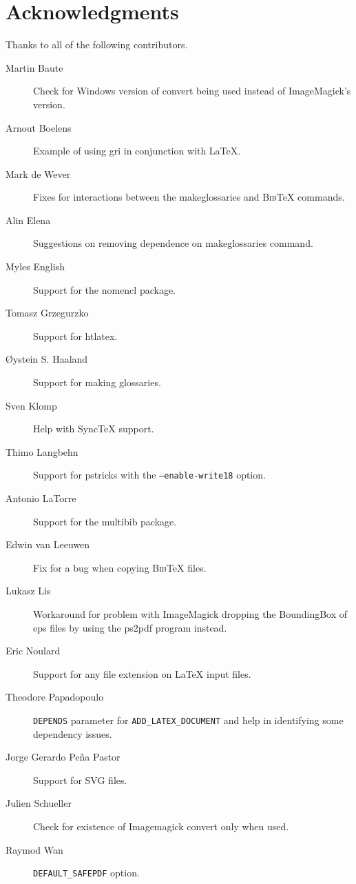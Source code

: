 \documentclass{article}
\newcommand*{\textfile}[1]{\textsf{#1}}
\newcommand*{\textprog}[1]{\textfile{#1}}
\newcommand*{\textlatexpackage}[1]{\textsf{#1}}
\newcommand*{\textcmake}[1]{\texttt{#1}}
\newcommand*{\latex}{\LaTeX\xspace}
\newcommand*{\bibtex}{\textsc{Bib}\TeX\xspace}
\renewcommand*{\synctex}{SyncTeX\xspace}
\newcommand*{\synctex}{SyncTeX\xspace}
\newcommand*{\ald}{\textcmake{ADD\_LATEX\_DOCUMENT}\xspace}
\begin{document}

  
  \section{Acknowledgments}

  Thanks to all of the following contributors.

  \begin{description}
  \item[Martin Baute] Check for Windows version of convert being used
    instead of ImageMagick's version.
  \item[Arnout Boelens] Example of using gri in conjunction with \latex.
  \item[Mark de Wever] Fixes for interactions between the
    \textprog{makeglossaries} and \bibtex commands.
  \item[Alin Elena] Suggestions on removing dependence on makeglossaries
    command.
  \item[Myles English] Support for the \textlatexpackage{nomencl} package.
  \item[Tomasz Grzegurzko] Support for htlatex.
  \item[\O{}ystein S. Haaland] Support for making glossaries.
  \item[Sven Klomp] Help with \synctex support.
  \item[Thimo Langbehn] Support for pstricks with the
    \textcmake{--enable-write18} option.
  \item[Antonio LaTorre] Support for the \textlatexpackage{multibib}
    package.
  \item[Edwin van Leeuwen] Fix for a bug when copying \bibtex files.
  \item[Lukasz Lis] Workaround for problem with ImageMagick dropping the
    BoundingBox of eps files by using the \textprog{ps2pdf} program
    instead.
  \item[Eric Noulard] Support for any file extension on \latex input files.
  \item[Theodore Papadopoulo] \textcmake{DEPENDS} parameter for \ald and
    help in identifying some dependency issues.
  \item[Jorge Gerardo Pe\~{n}a Pastor] Support for SVG files.
  \item[Julien Schueller] Check for existence of Imagemagick convert only
    when used.
  \item[Raymod Wan] \textcmake{DEFAULT\_SAFEPDF} option.
  \end{description}
\end{document}
